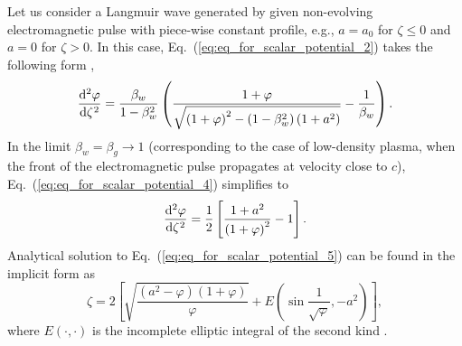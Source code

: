 \documentclass[10pt, a4paper, twoside, openright]{report}
\begin{document}
Let us consider a Langmuir wave generated by given non-evolving electromagnetic pulse with piece-wise constant profile,  e.g., $ a = a_0 $ for $ \zeta \leq 0 $ and $ a = 0 $ for $ \zeta > 0 $. In this case, Eq.~(\ref{eq:eq_for_scalar_potential_2}) takes the following form \cite{Bulanov2016, Bulanov2021},
\begin{equation}\label{eq:eq_for_scalar_potential_4}
\diff[2]{\varphi}{\zeta} = \frac{\beta_w}{1 - \beta_w^2} \left( \frac{1 + \varphi}{\sqrt{\left( 1 + \varphi \right)^2 - \left( 1 - \beta_w^2 \right) \left( 1 + a^2 \right)}} - \frac{1}{\beta_w} \right).
\end{equation}
In the limit $ \beta_w = \beta_g \rightarrow 1 $ (corresponding to the case of low-density plasma, when the front of the electromagnetic pulse propagates at velocity close to $ c $), Eq.~(\ref{eq:eq_for_scalar_potential_4}) simplifies to \cite{Bulanov1989, Berezhiani1990, Esarey2009, Bulanov2016, Bulanov2021}
\begin{equation}\label{eq:eq_for_scalar_potential_5}
\diff[2]{\varphi}{\zeta} = \frac{1}{2} \left[ \frac{1 + a^2}{\left( 1 + \varphi \right)^2} - 1 \right].
\end{equation}
Analytical solution to Eq.~(\ref{eq:eq_for_scalar_potential_5}) can be found in the implicit form as \cite{Bulanov1989, Berezhiani1990, Bulanov2016, Bulanov2021}
\begin{equation}\label{eq:analytical_solution}
\zeta = 2 \left[ \sqrt{\frac{\left( a^2 - \varphi \right) \left( 1 + \varphi \right)}{\varphi}} + E \left( \sin \frac{1}{\sqrt{\varphi}}, -a^2 \right) \right],
\end{equation}
where $ E \left( \cdot, \cdot \right) $ is the incomplete elliptic integral of the second kind \cite{Gradshteyn1980}. 
\end{document}
